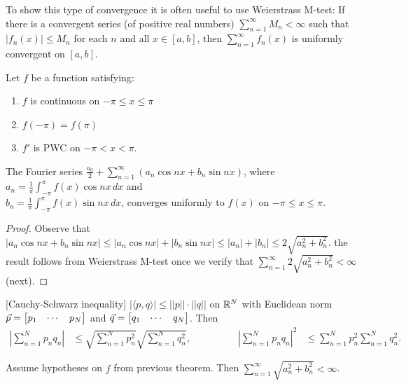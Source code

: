 \documentclass[]{article}
\begin{document}
To show this type of convergence it is often useful to use Weierstrass M-test: If there is a convergent series (of positive real numbers) $\sum_{n=1}^\infty M_n < \infty$ such that $|f_n(x)|\leq M_n$ for each $n$ and all $x\in[a,b]$, then $\sum_{n=1}^\infty f_n(x)$ is uniformly convergent on $[a,b]$.
\begin{theorem}
	Let $f$ be a function satisfying:
	\begin{enumerate}
		\item $f$ is continuous on $-\pi\leq x \leq \pi$
		\item $f(-\pi) = f(\pi)$
		\item $f'$ is PWC on $-\pi< x < \pi$.
	\end{enumerate}
	The Fourier series $\frac{a_0}{2} + \sum_{n=1}^\infty (a_n\cos{nx}+b_n\sin{nx})$, where $a_n=\frac{1}{\pi}\int_{-\pi}^\pi f(x) \cos{nx}\, dx$ and \\ $b_n=\frac{1}{\pi} \int_{-\pi}^\pi f(x) \sin{nx}\, dx$, converges uniformly to $f(x)$ on $-\pi \leq x \leq \pi$.
\end{theorem}
\begin{proof}
	Observe that $|a_n \cos{nx} + b_n\sin{nx} | \leq |a_n\cos{nx}| + |b_n\sin{nx}|\leq |a_n|+ |b_n| \leq 2\sqrt{a_n^2+b_n^2}$. the result follows from Weierstrass M-test once we verify that $\sum_{n=1}^\infty 2\sqrt{a_n^2 + b_n^2} <\infty$ (next).
\end{proof}
\begin{definition}
	[Cauchy-Schwarz inequality] $|\langle p,q\rangle |\leq ||p||\cdot||q||$ on $\mathbb{R}^N$ with Euclidean norm $\vec{p} = \begin{bmatrix} p_1 & \cdots & p_N\end{bmatrix}$ and $\vec{q} = \begin{bmatrix}q_1 & \cdots & q_N\end{bmatrix}$. Then
	\begin{align*}
		\left|\sum_{n=1}^N p_nq_n\right| &\leq \sqrt{\sum_{n=1}^N p_n^2}\sqrt{\sum_{n=1}^N{q_n^2}}, \qquad & \qquad
		\left| \sum_{n=1}^N p_n q_n \right|^2 &\leq \sum_{n=1}^N p_n^2 \sum_{n=1}^N q_n^2.
	\end{align*}
\end{definition}
\begin{lemma}
	Assume hypotheses on $f$ from previous theorem. Then $\sum_{n=1}^\infty \sqrt{a_n^2+b_n^2}<\infty$.
\end{lemma}
\end{document}
